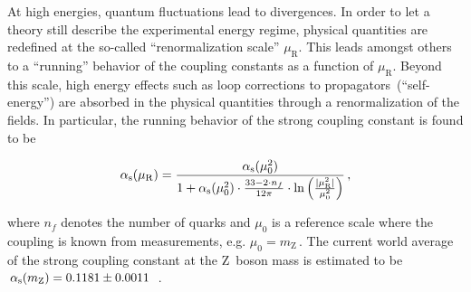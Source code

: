 
At high energies, quantum fluctuations lead to divergences. In order to let a theory still describe the experimental energy regime, physical quantities are redefined at the so-called ``renormalization scale'' $\mu_\mathrm{R}$. This leads amongst others to a ``running'' behavior of the coupling constants as a function of $\mu_\mathrm{R}$. Beyond this scale, high energy effects such as loop corrections to propagators~(``self-energy'') are absorbed in the physical quantities through a renormalization of the fields. In particular, the running behavior of the strong coupling constant is found to be 

\begin{equation}
{\alpha_\textrm{s}}(\mu_\mathrm{R})=\frac{{\alpha_\textrm{s}}(\mu_{0}^{2})}{1+{\alpha_\textrm{s}}(\mu_\mathrm{0}^2)\cdot\tfrac{33-2\cdot n_f}{12\pi}\cdot\ln\Big(\tfrac{|\mu_\mathrm{R}^2|}{\mu_{0}^{2}}\Big)}\,, \label{eq:theory-running-as}
\end{equation}

where $n_f$ denotes the number of quarks and $\mu_{0}$ is a reference scale where the coupling is known from measurements, e.g. $\mu_{0}=m_\mathrm{Z}\,$. The current world average of the strong coupling constant at the $\mathrm{Z}$~boson mass is estimated to be ${\alpha_\textrm{s}}(m_\mathrm{Z})=0.1181\pm0.0011$~\cite{Olive:2016xmw}. 

